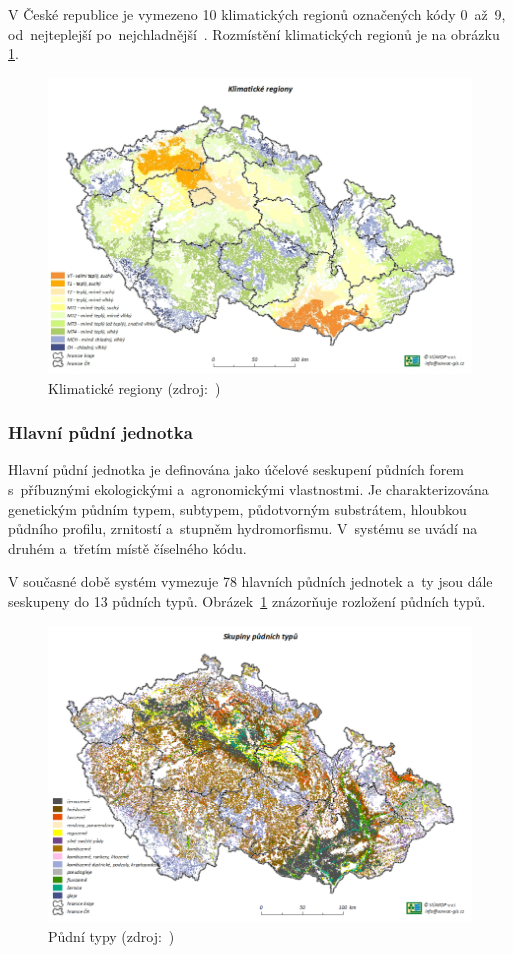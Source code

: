 V České republice je vymezeno 10 klimatických regionů označených kódy 0~až~9, od~nejteplejší po~nejchladnější~\citep{vyhlaska_327}. Rozmístění klimatických regionů je na obrázku \ref{fig:klimaticke_regiony}.

	\begin{figure}[H]
		\centering
		\includegraphics[width=.9\textwidth]{./pictures/klimaticky_region.png}
		\caption[Klimatické regiony]{Klimatické regiony (zdroj:~\citep{vumop_bpej})}
		\label{fig:klimaticke_regiony}
 	\end{figure}

\subsubsection{Hlavní půdní jednotka}
\label{hpj}

Hlavní půdní jednotka je definována jako účelové seskupení půdních forem s~příbuznými ekologickými a~agronomickými vlastnostmi. Je charakterizována genetickým půdním typem, subtypem, půdotvorným substrátem, hloubkou půdního profilu, zrnitostí a~stupněm hydromorfismu. V~systému  se uvádí na druhém a~třetím místě číselného kódu.

V současné době systém  vymezuje 78 hlavních půdních jednotek a~ty jsou dále seskupeny do 13 půdních typů. Obrázek~\ref{fig:klimaticke_regiony} znázorňuje rozložení půdních typů.

	\begin{figure}[H]
		\centering
		\includegraphics[width=.9\textwidth]{./pictures/pudni_typy.png}
		\caption[Půdní typy]{Půdní typy (zdroj:~\citep{vumop_bpej})}
		\label{fig:pudni_typy}
 	\end{figure}

